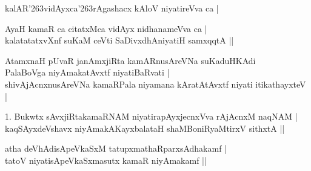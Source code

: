 \begin{entry}
\medskip
\begin{shl}
kalAR{\char'263}vidAyxca{\char'263}rAgashacx kAloV niyatireVva ca |
\end{shl}
\medskip
{}
\medskip
{}
\medskip
\begin{shl}
AyaH kamaR ca citatxMca vidAyx nidhanameVva ca |\\
kalatatatxvXnf suKaM ceVti SaDivxdhAniyatiH samxqqtA ||
\end{shl}
\medskip
{}
\medskip
\begin{shl}
AtamxnaH pUvaR janAmxjiRta kamARnusAreVNa suKaduHKAdi\\
PalaBoVga niyAmakatAvxtf niyatiBaRvati |\\
shivAjAcnxnusAreVNa kamaRPala niyamana kAratAtAvxtf niyati itikathayxteV |
\end{shl}
\medskip
\begin{shl}
1. Bukwtx sAvxjiRtakamaRNAM niyatirapAyxjecnxVva rAjAcnxM naqNAM |\\
kaqSAyxdeVshavx niyAmakAKayxbalataH shaMBoniRyaMtirxV sithxtA ||
\end{shl}
\medskip
{}
\medskip
\begin{shl}
atha deVhAdisApeVkaSxM tatupxmathaRparxsAdhakamf |\\
tatoV niyatisApeVkaSxmasutx kamaR niyAmakamf ||
\end{shl}
\medskip
{}
\medskip
{}
\end{entry}

